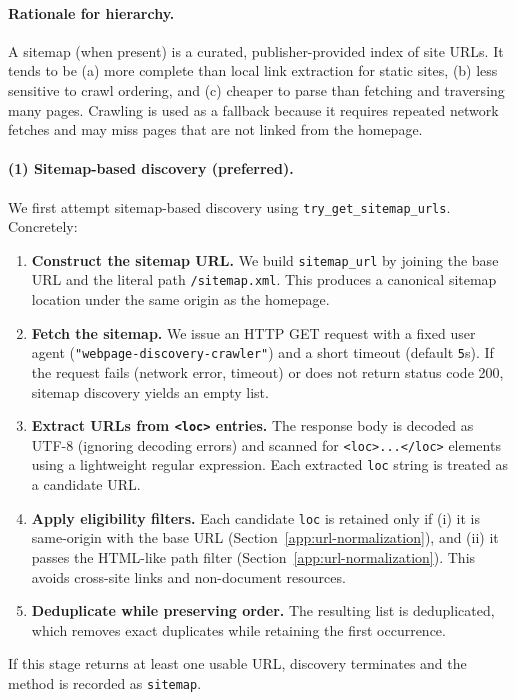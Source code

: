 \paragraph{Rationale for hierarchy.}
A sitemap (when present) is a curated, publisher-provided index of site URLs. It tends to be (a) more complete than local link extraction for static sites, (b) less sensitive to crawl ordering, and (c) cheaper to parse than fetching and traversing many pages. Crawling is used as a fallback because it requires repeated network fetches and may miss pages that are not linked from the homepage.

\paragraph{(1) Sitemap-based discovery (preferred).}
We first attempt sitemap-based discovery using \texttt{try\_get\_sitemap\_urls}. Concretely:
\begin{enumerate}
    \item \textbf{Construct the sitemap URL.} We build \texttt{sitemap\_url} by joining the base URL and the literal path \texttt{/sitemap.xml}. This produces a canonical sitemap location under the same origin as the homepage.
    \item \textbf{Fetch the sitemap.} We issue an HTTP GET request with a fixed user agent (\texttt{"webpage-discovery-crawler"}) and a short timeout (default \texttt{5}s). If the request fails (network error, timeout) or does not return status code 200, sitemap discovery yields an empty list.
    \item \textbf{Extract URLs from \texttt{<loc>} entries.} The response body is decoded as UTF-8 (ignoring decoding errors) and scanned for \texttt{<loc>...</loc>} elements using a lightweight regular expression. Each extracted \texttt{loc} string is treated as a candidate URL.
    \item \textbf{Apply eligibility filters.} Each candidate \texttt{loc} is retained only if (i) it is same-origin with the base URL (Section~\ref{app:url-normalization}), and (ii) it passes the HTML-like path filter (Section~\ref{app:url-normalization}). This avoids cross-site links and non-document resources.
    \item \textbf{Deduplicate while preserving order.} The resulting list is deduplicated, which removes exact duplicates while retaining the first occurrence.
\end{enumerate}
If this stage returns at least one usable URL, discovery terminates and the method is recorded as \texttt{sitemap}.

